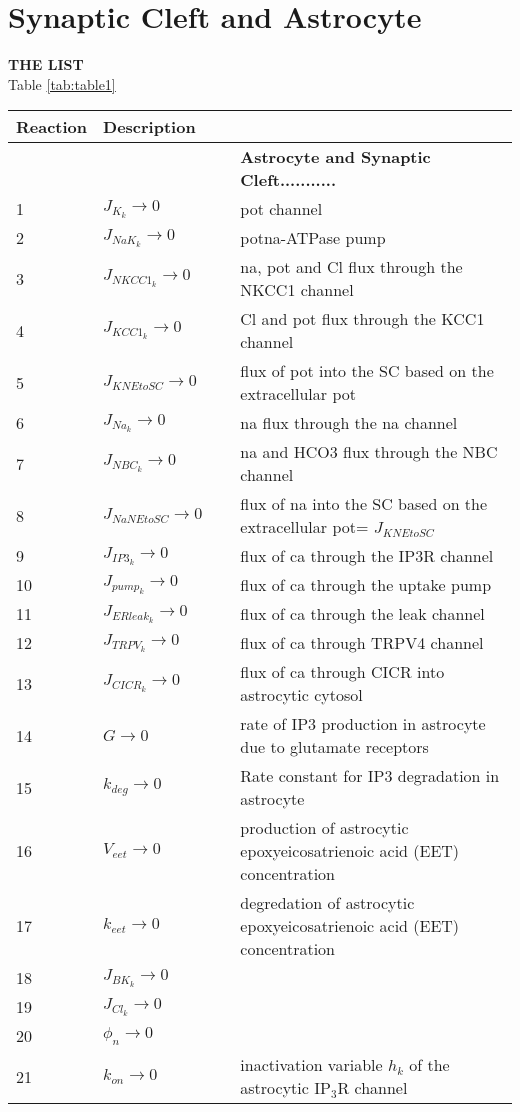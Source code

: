 \documentclass[]{article}
\newcommand{\na}{\gls{na}\xspace}
\newcommand{\pot}{\gls{pot}\xspace}
\newcommand{\ca}{\gls{ca}\xspace}
\begin{document}
\section{Synaptic Cleft and Astrocyte}
\textbf{THE LIST }\\
Table \ref{tab:table1}
\begin{longtable}[h!] { p{0.12\linewidth}  p{0.28\linewidth}     p{0.6\linewidth} }
	\hline
	Reaction     &    Description &  \\
	\hline
&  &  \textbf{Astrocyte and Synaptic Cleft...........}	 \\
1	&    $J_{K_k} \rightarrow 0$			& \pot channel				\\
2	&   $J_{NaK_k}\rightarrow 0$ 			& \pot \na -ATPase pump \\
3	&   	 $J_{NKCC1_k}\rightarrow 0$ 	    	& \na, \pot and Cl flux through the NKCC1 channel\\
4	& 	  $J_{KCC1_k}\rightarrow 0$ 		&  Cl and \pot flux through the KCC1 channel \\		
5	& 	  $J_{KNEtoSC}\rightarrow 0$			& flux of \pot into the SC based on the extracellular \pot  \\ 
6	& 	  $J_{Na_k}\rightarrow 0$		& \na flux through the \na channel   \\ 
7	& 	  $J_{NBC_k}\rightarrow 0$	& \na and HCO3 flux through the NBC channel  \\ 
8	&	  $J_{NaNEtoSC}\rightarrow 0$ 	& flux of \na into the SC based on the extracellular \pot =  $J_{KNEtoSC}$\\
9	& 	   $J_{IP3_k}\rightarrow 0$  & flux of \ca through the IP3R channel \\
10	& 	  $J_{pump_k}\rightarrow 0$	& flux of \ca through the uptake pump \\
11 & 	  $J_{ERleak_k}\rightarrow 0$ & flux of \ca through the leak channel\\
12	& 	  $J_{TRPV_k}\rightarrow 0$ &flux of \ca through TRPV4 channel \\
13	& 	  $J_{CICR_k}\rightarrow 0$  & flux of \ca through CICR into astrocytic cytosol \\
14	& 	  $G\rightarrow 0$ &  rate of IP3 production in astrocyte due to glutamate receptors\\
15	& 	   $k_{deg}\rightarrow 0$ & Rate constant for IP3 degradation in astrocyte\\
16	& 	   $V_{eet}\rightarrow 0$ & production of astrocytic epoxyeicosatrienoic acid (EET) concentration\\
17	& 	   $k_{eet}\rightarrow 0$ & degredation of astrocytic epoxyeicosatrienoic acid (EET) concentration\\
18	& 	   $J_{BK_k}\rightarrow 0$ & \\
19	& 	   $J_{Cl_k}\rightarrow 0$ & \\
20	& 	   $\phi_n\rightarrow 0$ & \\
21	& 	  $k_{on}  \rightarrow 0$ & inactivation variable $h_k$ of the astrocytic IP$_3$R channel \\


\end{longtable}
\end{document}
